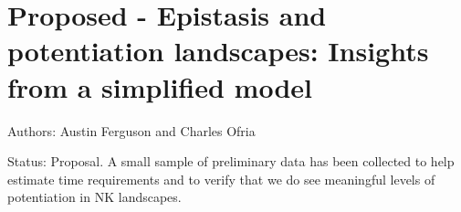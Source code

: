 \chapter{Proposed - Epistasis and potentiation landscapes: Insights from a simplified model}
\label{chap:simplified_model}
\noindent
Authors: Austin Ferguson and Charles Ofria

\noindent
Status: Proposal. A small sample of preliminary data has been collected to help estimate time requirements and to verify that we do see meaningful levels of potentiation in NK landscapes. 




